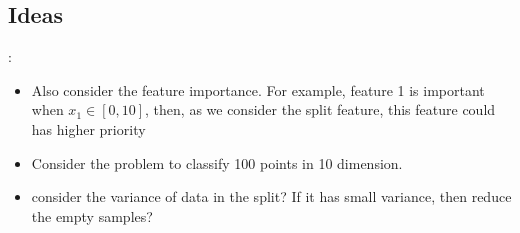 \documentclass[11pt,onecolumn]{IEEEtran}
\begin{document}
\subsection{Ideas}:
\begin{itemize}
	\item  Also consider the feature importance. For example, feature 1 is important when $x_1\in[0,10]$, then, as we consider the split feature, this feature could has higher priority
	\item Consider the problem to classify 100 points in 10 dimension.
    \item consider the variance of data in the split?  If it has small variance, then reduce the empty samples?
\end{itemize}










%

\end{document}
